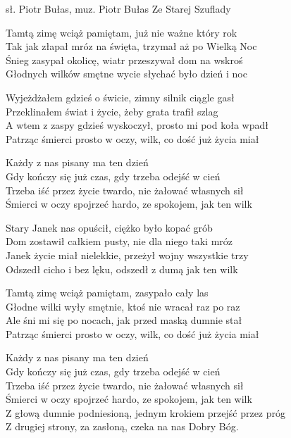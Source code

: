 {sł. Piotr Bułas, muz. Piotr Bułas}
{Ze Starej Szuflady}
\begin{text}
Tamtą zimę wciąż pamiętam, już nie ważne który rok\\
Tak jak złapał mróz na święta, trzymał aż po Wielką Noc\\
Śnieg zasypał okolicę, wiatr przeszywał dom na wskroś\\
Głodnych wilków smętne wycie słychać było dzień i noc

Wyjeżdżałem gdzieś o świcie, zimny silnik ciągle gasł\\
Przeklinałem świat i życie, żeby grata trafił szlag\\
A wtem z zaspy gdzieś wyskoczył, prosto mi pod koła wpadł\\
Patrząc śmierci prosto w oczy, wilk, co dość już życia miał

\vin Każdy z nas pisany ma ten dzień\\
\vin Gdy kończy się już czas, gdy trzeba odejść w cień\\
\vin Trzeba iść przez życie twardo, nie żałować własnych sił\\
\vin Śmierci w oczy spojrzeć hardo, ze spokojem, jak ten wilk

Stary Janek nas opuścił, ciężko było kopać grób\\
Dom zostawił całkiem pusty, nie dla niego taki mróz\\
Janek życie miał nielekkie, przeżył wojny wszystkie trzy\\
Odszedł cicho i bez lęku, odszedł z dumą jak ten wilk

Tamtą zimę wciąż pamiętam, zasypało cały las\\
Głodne wilki wyły smętnie, ktoś nie wracał raz po raz\\
Ale śni mi się po nocach, jak przed maską dumnie stał\\
Patrząc śmierci prosto w oczy, wilk, co dość już życia miał

\vin Każdy z nas pisany ma ten dzień\\
\vin Gdy kończy się już czas, gdy trzeba odejść w cień\\
\vin Trzeba iść przez życie twardo, nie żałować własnych sił\\
\vin Śmierci w oczy spojrzeć hardo, ze spokojem, jak ten wilk\\
\vin Z głową dumnie podniesioną, jednym krokiem przejść przez próg\\
\vin Z drugiej strony, za zasłoną, czeka na nas Dobry Bóg.
\end{text}
